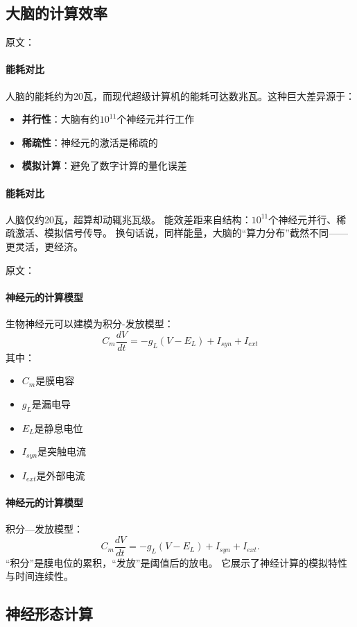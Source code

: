 \subsection{大脑的计算效率}

原文：
\paragraph{能耗对比}
人脑的能耗约为20瓦，而现代超级计算机的能耗可达数兆瓦。这种巨大差异源于：
\begin{itemize}
\item \textbf{并行性}：大脑有约$10^{11}$个神经元并行工作
\item \textbf{稀疏性}：神经元的激活是稀疏的
\item \textbf{模拟计算}：避免了数字计算的量化误差
\end{itemize}
\paragraph{能耗对比}
人脑仅约20瓦，超算却动辄兆瓦级。  
能效差距来自结构：$10^{11}$个神经元并行、稀疏激活、模拟信号传导。  
换句话说，同样能量，大脑的“算力分布”截然不同——\;更灵活，更经济。

原文：
\paragraph{神经元的计算模型}
生物神经元可以建模为积分-发放模型：
$$C_m \frac{dV}{dt} = -g_L(V - E_L) + I_{syn} + I_{ext}$$
其中：
\begin{itemize}
\item $C_m$是膜电容
\item $g_L$是漏电导
\item $E_L$是静息电位
\item $I_{syn}$是突触电流
\item $I_{ext}$是外部电流
\end{itemize}
\paragraph{神经元的计算模型}
积分—发放模型：
$$C_m\dfrac{dV}{dt}=-g_L(V-E_L)+I_{syn}+I_{ext}.$$
“积分”是膜电位的累积，“发放”是阈值后的放电。  
它展示了神经计算的模拟特性与时间连续性。

\subsection{神经形态计算}

